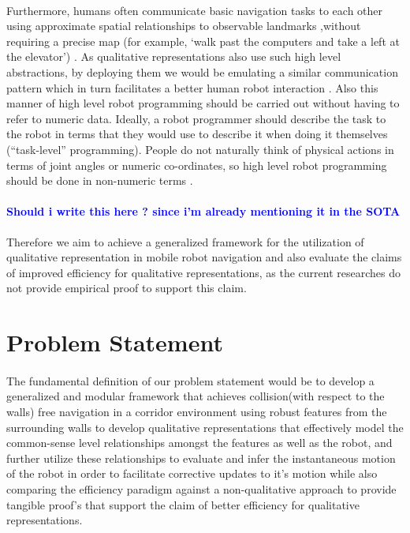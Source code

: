 \paragraph{} Furthermore, humans often communicate basic navigation tasks to each other using approximate spatial relationships to observable landmarks \cite{michon2001and} \cite{chen2015survey} ,without requiring a precise map (for example, `walk past the computers and take a left at the elevator') \cite{shah2013qualitative}. As qualitative representations also use such high level abstractions, by deploying them we would be emulating a similar communication pattern which in turn facilitates a better human robot interaction \cite{dondrup2015computational}. Also this manner of high level robot programming should be carried out without having to refer to numeric data. Ideally, a robot programmer should describe the task to the robot in terms that they would use to describe it when doing it themselves (``task-level'' programming). People do not naturally think of physical actions in terms of joint angles or numeric co-ordinates, so high level robot programming should be done in non-numeric terms \cite{blackwell1988spatial}.


\paragraph{\textcolor{blue}{Should i write this here ? since i'm already mentioning it in the SOTA}}Therefore we aim to achieve a generalized framework for the utilization of qualitative representation in mobile robot navigation and also evaluate the claims of improved efficiency for qualitative representations, as the current researches do not provide empirical proof to support this claim.

\section{Problem Statement}
\paragraph{} The fundamental definition of our problem statement would be to develop a generalized and modular framework that  achieves collision(with respect to the walls) free navigation in a corridor environment using robust features from the surrounding walls to develop qualitative representations that effectively model the common-sense level relationships amongst the features as well as the robot, and further utilize these relationships to evaluate and infer the instantaneous motion of the robot in order to facilitate corrective updates to it's motion while also comparing the efficiency paradigm against a non-qualitative approach to provide tangible proof's that support the claim of better efficiency for qualitative representations.


